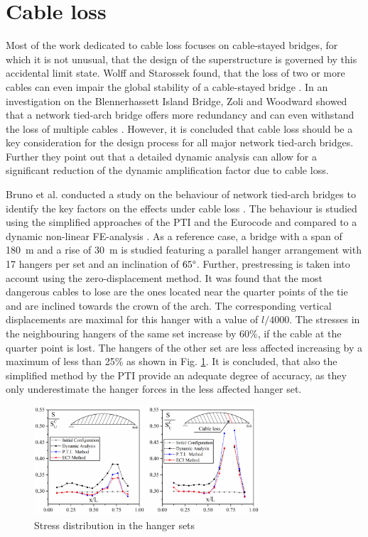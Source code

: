 \section{Cable loss} \label{sec:rev_loss}

Most of the work dedicated to cable loss focuses on cable-stayed bridges, for which it is not unusual, that the design of the superstructure is governed by this accidental limit state. Wolff and Starossek found, that the loss of two or more cables can even impair the global stability of a cable-stayed bridge \cite{Wolff}. In an investigation on the Blennerhassett Island Bridge, Zoli and Woodward showed that a network tied-arch bridge offers more redundancy and can even withstand the loss of multiple cables \cite{Zoli}. However, it is concluded that cable loss should be a key consideration for the design process for all major network tied-arch bridges. Further they point out that a detailed dynamic analysis can allow for a significant reduction of the dynamic amplification factor due to cable loss.\bigskip

Bruno et al. conducted a study on the behaviour of network tied-arch bridges to identify the key factors on the effects under cable loss \cite{Bruno}. The behaviour is studied using the simplified approaches of the PTI and the Eurocode and compared to a dynamic non-linear FE-analysis \cite{PTI}. As a reference case, a bridge with a span of \SI{180}{m} and a rise of \SI{30}{m} is studied featuring a parallel hanger arrangement with 17 hangers per set and an inclination of $65 \degree$. Further, prestressing is taken into account using the zero-displacement method. It was found that the most dangerous cables to lose are the ones located near the quarter points of the tie and are inclined towards the crown of the arch. The corresponding vertical displacements are maximal for this hanger with a value of $l/4000$. The stresses in the neighbouring hangers of the same set increase by 60\%, if the cable at the quarter point is lost. The hangers of the other set are less affected increasing by a maximum of less than 25\% as shown in Fig. \ref{fig:Bruno}. It is concluded, that also the simplified method by the PTI provide an adequate degree of accuracy, as they only underestimate the hanger forces in the less affected hanger set.
\begin{figure}[H]
    \centering
    \includegraphics[width=0.75\textwidth]{Pictures/BrunoCableLoss.PNG}
    \caption{Stress distribution in the hanger sets \cite{Bruno}}
    \label{fig:Bruno}
\end{figure}

